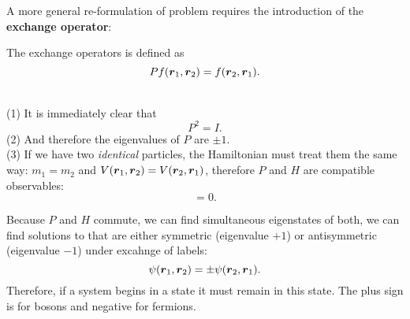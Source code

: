 A more general re-formulation of problem requires the introduction of 
the \textbf{exchange operator}:
\begin{defi}
The exchange operators is defined as 
\begin{equation}
Pf(\boldsymbol{r}_1,\boldsymbol{r}_2)=f(\boldsymbol{r}_2,\boldsymbol{r}_1). 
\end{equation}
\end{defi}
\begin{defi}
\ \\
(1) It is immediately clear that
\begin{equation}
P^2=I.
\end{equation}
(2) And therefore the eigenvalues of $P$ are $\pm1$. \\
(3) If we have two \textit{identical} particles, the Hamiltonian must treat them the 
same way: $m_1=m_2$ and $V(\boldsymbol{r}_1,\boldsymbol{r}_2)=V(\boldsymbol{r}_2,\boldsymbol{r}_1)$, therefore $P$ and $H$ are compatible observables: 
\begin{equation}
[P,H]=0.
\end{equation}
\end{defi}
\begin{thrm}
\label{sym_req}
Because $P$ and $H$ commute, we can find simultaneous eigenstates of both, \ie 
we can find solutions to \sch that are either symmetric (eigenvalue $+1$) or 
antisymmetric (eigenvalue $-1$) under excahnge of labels:
\begin{equation}
\psi(\boldsymbol{r}_1,\boldsymbol{r}_2)=\pm\psi(\boldsymbol{r}_2,\boldsymbol{r}_1). 
\end{equation}
Therefore, if a system begins in a state it must remain in this state. 
The plus sign is for bosons and negative for fermions.
\end{thrm}
